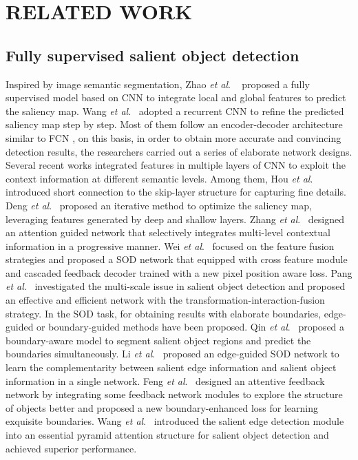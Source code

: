 \documentclass[journal]{IEEEtran}
\newcommand{\etal}{\textit{et al}.}
\begin{document}
\section{RELATED WORK}
\subsection{Fully supervised salient object detection}
Inspired by image semantic segmentation, Zhao \etal
~\cite{DBLP:conf/cvpr/ZhaoOLW15} proposed a fully supervised model based on CNN to integrate local and
global features to predict the saliency map. Wang \etal ~\cite{DBLP:conf/eccv/WangWLZR16}
adopted a recurrent CNN to refine the predicted saliency map step by step. Most of them follow an encoder-decoder architecture similar to FCN \cite{long2015fully}, on this basis, in order to obtain more accurate and convincing detection results, the researchers carried out a series of elaborate network designs.
Several recent works \cite{DBLP:conf/iccv/ZhangWLWR17,hou2017deeply,DBLP:conf/ijcai/DengHZXQHH18,DBLP:conf/aaai/HuZQFH18,DBLP:conf/cvpr/ZhangDLH018,DBLP:conf/cvpr/ZhangWQLW18,wei2020f3net,DBLP:conf/aaai/WangCZZ0G20,DBLP:conf/cvpr/PangZZL20,DBLP:conf/cvpr/WeiWWSH020,DBLP:conf/eccv/ZhaoPZLZ20} integrated features in multiple layers of CNN to exploit the context information at different semantic levels. Among them, Hou \etal ~\cite{hou2017deeply} introduced short connection to the skip-layer structure for capturing fine details. Deng \etal ~\cite{DBLP:conf/ijcai/DengHZXQHH18} proposed an iterative method to optimize the saliency map, leveraging features generated by deep and shallow layers. Zhang \etal ~\cite{DBLP:conf/cvpr/ZhangWQLW18} designed an attention guided network that selectively integrates multi-level contextual information in a progressive manner. Wei \etal ~\cite{wei2020f3net} focused on the feature fusion strategies and proposed a SOD network that equipped with cross feature module and cascaded feedback decoder trained with a new pixel position aware loss. Pang \etal ~\cite{DBLP:conf/cvpr/PangZZL20} investigated the multi-scale issue in salient object detection and proposed an effective and efficient network with the transformation-interaction-fusion strategy.
In the SOD task, for obtaining results with elaborate boundaries, edge-guided or boundary-guided methods have been proposed. Qin \etal ~\cite{feng2019attentive} proposed a boundary-aware model to segment salient object regions and predict the boundaries simultaneously. Li \etal ~\cite{zhao2019egnet} proposed an edge-guided SOD network to learn the complementarity between salient edge information and salient object information in a single network. Feng \etal ~\cite{feng2019attentive} designed an attentive feedback network by integrating some feedback network modules to explore the structure of objects better and proposed a new boundary-enhanced loss for learning exquisite boundaries. Wang \etal ~\cite{wang2019salient} introduced the salient edge detection module into an essential pyramid attention structure for salient object detection and achieved superior performance.
\end{document}
